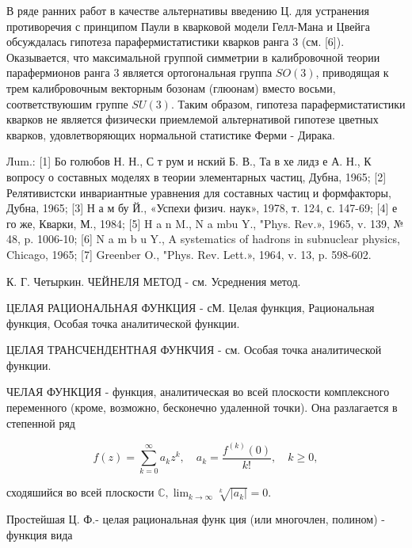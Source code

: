 \documentclass[10pt]{article}
\begin{document}
В ряде ранних работ в качестве альтернативы введению Ц. для устранения противоречия с принципом Паули в кварковой модели Гелл-Мана и Цвейга обсуждалась гипотеза парафермистатистики кварков ранга 3 (см. [6]). Оказывается, что максимальной группой симметрии в калибровочной теории парафермионов ранга 3 является ортогональная группа $S O(3)$, приводящая к трем калибровочным векторным бозонам (глюонам) вместо восьми, соответствуюшим группе $S U(3)$. Таким образом, гипотеза парафермистатистики кварков не является физически приемлемой альтернативой гипотезе цветных кварков, удовлетворяющих нормальной статистике Ферми - Дирака.



Лum.: [1] Бо голюбов Н. Н., С т рум и нский Б. В., Та в хе лидз е А. Н., К вопросу о составных моделях в теории элементарных частиц, Дубна, 1965; [2] Релятивистски инвариантные уравнения для составных частиц и формфакторы, Дубна, 1965; [3] Н а м бу Й., «Успехи физич. наук», 1978, т. 124, с. 147-69; [4] е го же, Кварки, М., 1984; [5] H a n M., N a mbu Y., "Phys. Rev.», 1965, v. 139, № 48, p. 1006-10; [6] N a m b u Y., A systematics of hadrons in subnuclear physics, Chicago, 1965; [7] Greenber O., "Phys. Rev. Lett.», 1964, v. 13, p. 598-602.



К. Г. Четыркин. ЧЕЙНЕЛЯ МЕТОД - см. Усреднения метод.



ЦЕЛАЯ РАЦИОНАЛЬНАЯ ФУНКЦИЯ - сМ. Целая функция, Рациональная функция, Особая точка аналитической функции.



ЦЕЛАЯ ТРАНСЧЕНДЕНТНАЯ ФУНКЧИЯ - см. Особая точка аналитической функции.



ЧЕЛАЯ ФУНКЦИЯ - функция, аналитическая во всей плоскости комплексного переменного (кроме, возможно, бесконечно удаленной точки). Она разлагается в степенной ряд



\[

f(z)=\sum_{k=0}^{\infty} a_{k} z^{k}, \quad a_{k}=\frac{f^{(k)}(0)}{k !}, \quad k \geqslant 0,

\]



сходяшийся во всей плоскости $\mathbb{C}, \lim _{k \rightarrow \infty} \sqrt[k]{\left|a_{k}\right|}=0$.



Простейшая Ц. Ф.- целая рациональная функ ция (или многочлен, полином) - функция вида
\end{document}
